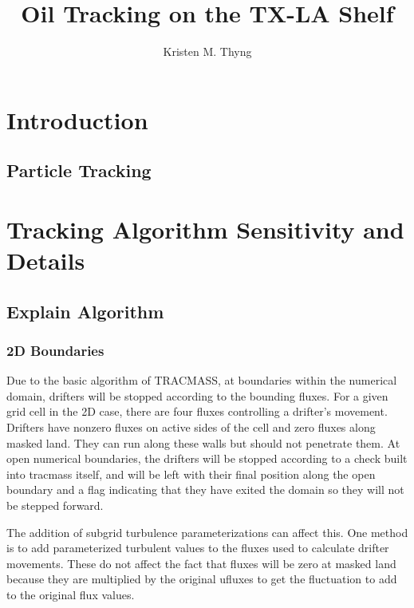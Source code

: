\documentclass[11pt]{article}
\title{Oil Tracking on the TX-LA Shelf}
\author{Kristen M. Thyng}
\begin{document}
\maketitle

\section{Introduction}

\subsection{Particle Tracking}


\section{Tracking Algorithm Sensitivity and Details}

\subsection{Explain Algorithm}

\subsubsection{2D Boundaries}

Due to the basic algorithm of TRACMASS, at boundaries within the numerical domain, drifters will be stopped according to the bounding fluxes. For a given grid cell in the 2D case, there are four fluxes controlling a drifter's movement. Drifters have nonzero fluxes on active sides of the cell and zero fluxes along masked land. They can run along these walls but should not penetrate them. At open numerical boundaries, the drifters will be stopped according to a check built into tracmass itself, and will be left with their final position along the open boundary and a flag indicating that they have exited the domain so they will not be stepped forward.

The addition of subgrid turbulence parameterizations can affect this. One method is to add parameterized turbulent values to the fluxes used to calculate drifter movements. These do not affect the fact that fluxes will be zero at masked land because they are multiplied by the original ufluxes to get the fluctuation to add to the original flux values.
\end{document}
